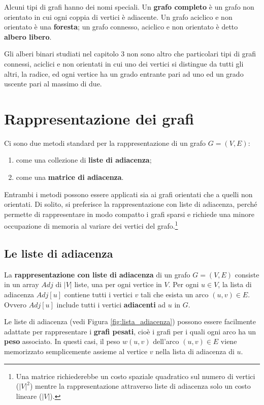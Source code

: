 Alcuni tipi di grafi hanno dei nomi speciali. Un \textbf{grafo completo} è un grafo non orientato in cui ogni coppia di vertici è adiacente. Un grafo aciclico e non orientato è una \textbf{foresta}; un grafo connesso, aciclico e non orientato è detto \textbf{albero libero}.


\begin{osservation}
		Gli alberi binari studiati nel capitolo 3 non sono altro che particolari tipi di grafi connessi, aciclici e non orientati in cui uno dei vertici si distingue da tutti gli altri, la radice, ed ogni vertice ha un grado entrante pari ad uno ed un grado uscente pari al massimo di due.
\end{osservation}

\section{Rappresentazione dei grafi}
Ci sono due metodi standard per la rappresentazione di un grafo $G=(V,E)$:
\begin{enumerate}
	\item come una collezione di \textbf{liste di adiacenza};
	\item come una \textbf{matrice di adiacenza}.
\end{enumerate}

Entrambi i metodi possono essere applicati sia ai grafi orientati che a quelli non orientati. Di solito, si preferisce la rappresentazione con liste di adiacenza, perché permette di rappresentare in modo compatto i grafi sparsi e richiede una minore occupazione di memoria al variare dei vertici del grafo.\footnote{Una matrice richiederebbe un costo spaziale quadratico sul numero di vertici ($|V|^{2}$) mentre la rappresentazione attraverso liste di adiacenza solo un costo lineare ($|V|$).}

\subsection{Le liste di adiacenza}
La \textbf{rappresentazione con liste di adiacenza} di un grafo $G=(V,E)$ consiste in un array $Adj$ di $|V|$ liste, una per ogni vertice in $V$. Per ogni $u \in V$, la lista di adiacenza $Adj[u]$ contiene tutti i vertici $v$ tali che esista un arco $(u,v)\in E$. Ovvero $Adj[u]$ include tutti i vertici \textbf{adiacenti} ad $u$ in $G$.

Le liste di adiacenza (vedi Figura \ref{fig:lista_adiacenza}) possono essere facilmente adattate per rappresentare i \textbf{grafi pesati}, cioè i grafi per i quali ogni arco ha un \textbf{peso} associato. In questi casi, il peso $w(u,v)$ dell'arco $(u,v) \in E$ viene memorizzato semplicemente assieme al vertice $v$ nella lista di adiacenza di $u$.

